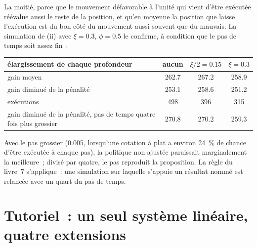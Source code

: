 La moitié, parce que le mouvement défavorable à l'unité qui vient d'être exécutée réévalue aussi le reste de la position, et qu'en moyenne la position que laisse l'exécution est du
bon côté du mouvement aussi souvent que du mauvais. La simulation de (ii) avec $\xi=0.3$, $\phi=0.5$ le confirme, à condition que le pas de temps soit
assez fin~:

\begin{center}
\small
\begin{tabular}{@{}lccc@{}}
\toprule
élargissement de chaque profondeur & aucun & $\xi/2=0.15$ & $\xi=0.3$\\
\midrule
gain moyen & 262.7 & 267.2 & 258.9\\
gain diminué de la pénalité & 253.1 & 258.6 & 251.2\\
exécutions & 498 & 396 & 315\\
gain diminué de la pénalité, pas de temps quatre fois plus grossier & 270.8 & 270.2 & 259.3\\
\bottomrule
\end{tabular}
\end{center}

Avec le pas grossier (0.005, lorsqu'une cotation à plat a environ 24~\% de chance d'être exécutée à chaque pas), la politique non ajustée paraissait marginalement la meilleure~; divisé par quatre, le pas
reproduit la proposition. La règle du livre~7 s'applique~: une simulation sur laquelle s'appuie un résultat nommé est relancée avec un quart du
pas de temps.

\section{Tutoriel~: un seul système linéaire, quatre extensions}\label{tut:hf:extensions-of-the-inventory-framework:tut}


